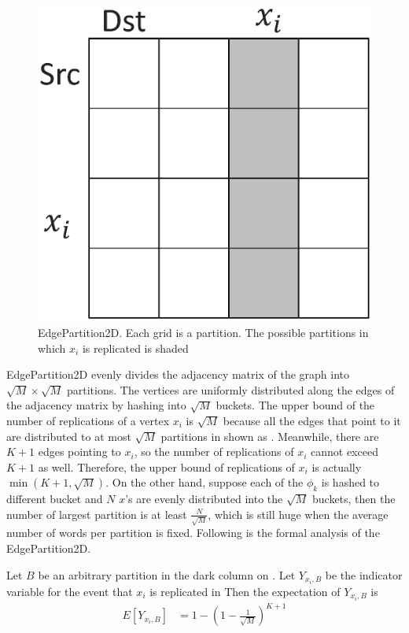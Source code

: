 \begin{figure}[h]
	\centering
	\includegraphics[scale=0.3]{figs/2dhash.eps}
	\caption{EdgePartition2D.  Each grid is a partition. The possible partitions in which $x_i$ is
	replicated is shaded}
	\label{fig:2dhash}
\end{figure}

EdgePartition2D evenly divides the adjacency matrix of the graph into $\sqrt{M}
\times \sqrt{M}$ partitions. The vertices are uniformly distributed along the
edges of the adjacency matrix by hashing into $\sqrt{M}$ buckets. The upper
bound of the number of replications of a vertex $x_i$ is $\sqrt{M}$ because all
the edges that point to it are distributed to at most $\sqrt{M}$ partitions
in shown as .  Meanwhile, there are $K+1$
edges pointing to $x_i$, so the number of replications of $x_i$ cannot exceed
$K+1$ as well. Therefore, the upper bound of replications of $x_i$ is actually
$\min(K+1, \sqrt{M})$. On the other hand, suppose each of the $\phi_k$ is
hashed to different bucket and $N$ $x$'s are evenly distributed into the
$\sqrt{M}$ buckets, then the number of largest partition is at least
$\frac{N}{\sqrt{M}}$, which is still huge when the average number of words per
partition is fixed. Following is the formal analysis of the EdgePartition2D.

Let $B$ be an arbitrary
partition in the dark column on .
Let $Y_{x_i, B}$ be the indicator variable for the event that $x_i$ is replicated in 
Then the expectation of $Y_{x_i, B}$ is
\begin{align*}
	E[Y_{x_i, B}] &= 1 - (1 - \frac{1}{\sqrt{M}})^{K+1} \\
\end{align*}

